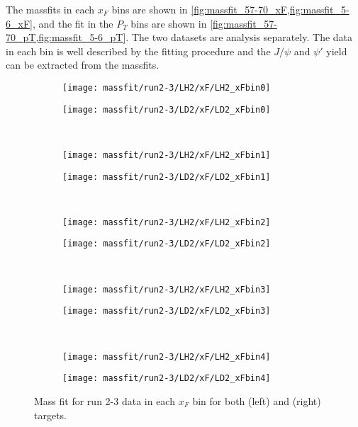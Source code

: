 \documentclass[../main.tex]{subfiles}
\begin{document}
	
The massfits in each $x_F$ bins are shown in \cref{fig:massfit_57-70_xF,fig:massfit_5-6_xF}, 
and the fit in the $P_T$ bins are shown in \cref{fig:massfit_57-70_pT,fig:massfit_5-6_pT}.
The two datasets are analysis separately. The data in each bin is well described by the fitting procedure
and the $J/\psi$ and $\psi'$ yield can be extracted from the massfits.
\begin{figure}[h]
	\centering
	\begin{subfigure}{0.4\linewidth}
		\texttt{[image: massfit/run2-3/LH2/xF/LH2\_xFbin0]}
	\end{subfigure}
	\begin{subfigure}{0.4\linewidth}
		\texttt{[image: massfit/run2-3/LD2/xF/LD2\_xFbin0]}
	\end{subfigure}\\
	\begin{subfigure}{0.4\linewidth}
		\texttt{[image: massfit/run2-3/LH2/xF/LH2\_xFbin1]}
	\end{subfigure}
	\begin{subfigure}{0.4\linewidth}
		\texttt{[image: massfit/run2-3/LD2/xF/LD2\_xFbin1]}
	\end{subfigure}\\
	\begin{subfigure}{0.4\linewidth}
		\texttt{[image: massfit/run2-3/LH2/xF/LH2\_xFbin2]}
	\end{subfigure}
	\begin{subfigure}{0.4\linewidth}
		\texttt{[image: massfit/run2-3/LD2/xF/LD2\_xFbin2]}
	\end{subfigure}\\
	\begin{subfigure}{0.4\linewidth}
		\texttt{[image: massfit/run2-3/LH2/xF/LH2\_xFbin3]}
	\end{subfigure}
	\begin{subfigure}{0.4\linewidth}
		\texttt{[image: massfit/run2-3/LD2/xF/LD2\_xFbin3]}
	\end{subfigure}\\
	\begin{subfigure}{0.4\linewidth}
		\texttt{[image: massfit/run2-3/LH2/xF/LH2\_xFbin4]}
	\end{subfigure}
	\begin{subfigure}{0.4\linewidth}
		\texttt{[image: massfit/run2-3/LD2/xF/LD2\_xFbin4]}
	\end{subfigure}
	\caption{Mass fit for run 2-3 data in each $x_F$ bin for both (left) and (right) targets. }
	\label{fig:massfit_57-70_xF}
\end{figure}
\end{document}
